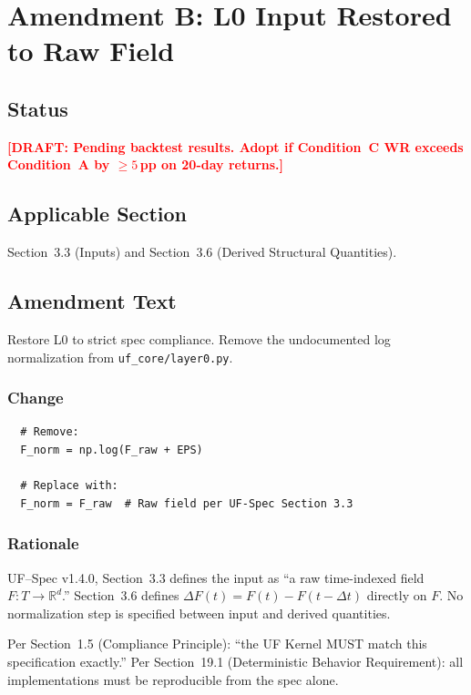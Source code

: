 \documentclass[11pt,a4paper]{article}
\newcommand{\draft}[1]{\textcolor{red}{\textbf{[DRAFT: #1]}}}
\begin{document}
\section{Amendment B: L0 Input Restored to Raw Field}
\label{sec:amendment-b}

\subsection{Status}
\draft{Pending backtest results. Adopt if Condition~C WR exceeds Condition~A by $\geq 5$\,pp on 20-day returns.}

\subsection{Applicable Section}
Section~3.3 (Inputs) and Section~3.6 (Derived Structural Quantities).

\subsection{Amendment Text}

Restore L0 to strict spec compliance. Remove the undocumented log
normalization from \texttt{uf\_core/layer0.py}.

\subsubsection*{Change}
\begin{verbatim}
  # Remove:
  F_norm = np.log(F_raw + EPS)

  # Replace with:
  F_norm = F_raw  # Raw field per UF-Spec Section 3.3
\end{verbatim}

\subsubsection*{Rationale}
UF--Spec v1.4.0, Section~3.3 defines the input as ``a raw time-indexed field
$F : T \to \mathbb{R}^d$.'' Section~3.6 defines $\Delta F(t) = F(t) - F(t - \Delta t)$
directly on $F$. No normalization step is specified between input and
derived quantities.

Per Section~1.5 (Compliance Principle): ``the UF Kernel MUST match this
specification exactly.'' Per Section~19.1 (Deterministic Behavior Requirement):
all implementations must be reproducible from the spec alone.
\end{document}
